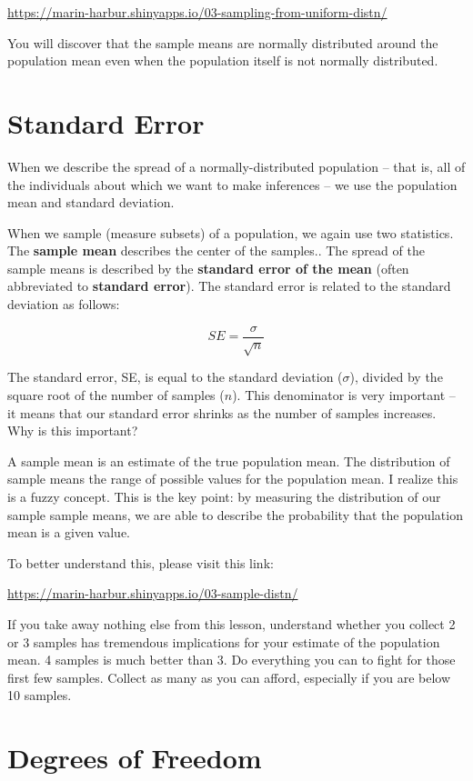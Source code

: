 \documentclass[
]{book}
\begin{document}
\url{https://marin-harbur.shinyapps.io/03-sampling-from-uniform-distn/}

You will discover that the sample means are normally distributed around
the population mean even when the population itself is not normally
distributed.

\hypertarget{standard-error}{%
\section{Standard Error}\label{standard-error}}

When we describe the spread of a normally-distributed population -- that
is, all of the individuals about which we want to make inferences -- we
use the population mean and standard deviation.

When we sample (measure subsets) of a population, we again use two
statistics. The \textbf{sample mean} describes the center of the samples..
The spread of the sample means is described by the \textbf{standard error of
the mean} (often abbreviated to \textbf{standard error}). The standard error
is related to the standard deviation as follows:

\[SE = \frac{\sigma}{\sqrt n} \]

The standard error, SE, is equal to the standard deviation (\(\sigma\)),
divided by the square root of the number of samples (\(n\)). This
denominator is very important -- it means that our standard error
shrinks as the number of samples increases. Why is this important?

A sample mean is an estimate of the true population mean. The
distribution of sample means the range of possible values for the
population mean. I realize this is a fuzzy concept. This is the key
point: by measuring the distribution of our sample sample means, we are
able to describe the probability that the population mean is a given
value.

To better understand this, please visit this link:

\url{https://marin-harbur.shinyapps.io/03-sample-distn/}

If you take away nothing else from this lesson, understand whether you
collect 2 or 3 samples has tremendous implications for your estimate of
the population mean. 4 samples is much better than 3. Do everything you
can to fight for those first few samples. Collect as many as you can
afford, especially if you are below 10 samples.

\hypertarget{degrees-of-freedom}{%
\section{Degrees of Freedom}\label{degrees-of-freedom}}
\end{document}
